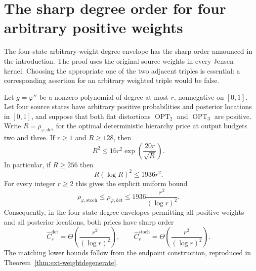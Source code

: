 \section{The sharp degree order for four arbitrary positive weights}
\label{sec:weighted-sharp}

The four-state arbitrary-weight degree envelope has the sharp order
announced in the introduction. The proof uses the original source weights
in every Jensen kernel. Choosing the appropriate one of the two adjacent
triples is essential: a corresponding assertion for an arbitrary weighted
triple would be false.

\begin{theorem}
\label{thm:weighted-sharp}
Let $g=\varphi''$ be a nonzero polynomial of degree at most $r$, nonnegative
on $[0,1]$. Let four source states have arbitrary positive probabilities
and posterior locations in $[0,1]$, and suppose that both flat distortions
$\operatorname{OPT}_2$ and $\operatorname{OPT}_3$ are positive. Write
$R=\rho_{\varphi,\mathrm{det}}$ for the optimal deterministic hierarchy
price at output budgets two and three.
If $r\ge1$ and $R\ge128$, then
\begin{equation}
 R^2\le16r^2\exp\left(\frac{20r}{\sqrt R}\right).
 \label{eq:weighted-implicit}
\end{equation}
In particular, if $R\ge256$ then
\begin{equation}
 R(\log R)^2\le1936r^2.
 \label{eq:weighted-Rlog}
\end{equation}
For every integer $r\ge2$ this gives the explicit uniform bound
\begin{equation}
 \rho_{\varphi,\mathrm{stoch}}
 \le\rho_{\varphi,\mathrm{det}}
 \le1936\frac{r^2}{(\log r)^2}.
 \label{eq:weighted-sharp-upper}
\end{equation}
Consequently, in the four-state degree envelopes permitting all positive
weights and all posterior locations, both prices have sharp order
\[
 \widehat C_r^{\mathrm{det}}
 =\Theta\!\left(\frac{r^2}{(\log r)^2}\right),\qquad
 \widehat C_r^{\mathrm{stoch}}
 =\Theta\!\left(\frac{r^2}{(\log r)^2}\right).
\]
The matching lower bounds follow from the endpoint construction, reproduced in
Theorem~\ref{thm:ext-weightdegenerate}.
\end{theorem}

